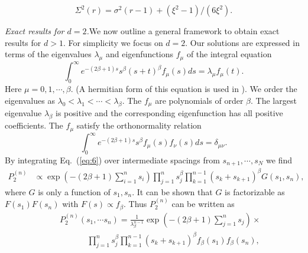 \documentclass[reprint,amsmath,amssymb,showpacs,aps,]{revtex4-1}
\begin{document}
{\begin{equation} \label{eq:19}
\Sigma^{2}(r)= \sigma^{2}(r-1) + (\xi^2 -1)/(6\xi^{2}).
\end{equation}\par
\textit{Exact results for $d=2$.}\textemdash  We now outline a general framework to obtain exact results for $d>1$. For simplicity we focus on $d=2$. Our solutions are expressed in terms of the eigenvalues $\lambda_{\mu}$ and eigenfunctions $f_{\mu}$ of the integral equation 
\begin{equation}\label{eq:20}
\int_{0}^{\infty}e^{-(2\beta+1)s} s^{\beta}(s+t)^{\beta}f_{\mu}(s)ds=\lambda_{\mu}f_{\mu}(t).
\end{equation}
Here $\mu= 0,1,\cdots, \beta$. (A hermitian form of this equation is used in \cite{BGS2}). We order the eigenvalues as $\lambda_{0}<\lambda_{1}< \cdots < \lambda_{\beta}$. The $f_{\mu}$ are polynomials of order $\beta$. The largest eigenvalue $\lambda_{\beta}$ is positive and the corresponding eigenfunction has all positive coefficients. The $f_{\mu}$ satisfy the orthonormality relation
\begin{equation}\label{eq:21}
\int_{0}^{\infty}e^{-(2\beta+1)s} s^{\beta}f_{\mu}(s)f_{\nu}(s)ds= \delta_{\mu\nu}.
\end{equation}
By integrating Eq.~(\ref{eq:6}) over intermediate spacings from $s_{n+1},\cdots,s_{N}$ we find
\begin{align}\label{eq:22}
P_{2}^{(n)}&\propto \exp\left(-(2\beta+1)\sum_{i=1}^{n}s_{i}\right)\prod_{j=1}^{n}s_{j}^{\beta}\prod_{k=1}^{n-1}(s_{k}+s_{k+1})^{\beta}G(s_{1},s_{n}),
\end{align}
where $G$ is only a function of $s_{1},s_{n}$. It can be shown that $G$ is factorizable as $F(s_{1})F(s_{n})$ with $F(s) \propto f_{\beta}$. Thus $P_{2}^{(n)}$ can be written as
\begin{eqnarray}
\label{eq:23}
&& P_{2}^{(n)}(s_{1},\cdots s_{n})= \frac{1}{\lambda_{\beta}^{n-1}}\exp\left(-(2\beta+1)\sum_{j=1}^{n}s_{j}\right) \times 
\nonumber \\
&& ~~~~~~~~~~~~~~~ \prod_{j=1}^{n}s_{j}^{\beta}\prod_{k=1}^{n-1}(s_{k}+s_{k+1})^{\beta}f_{\beta}(s_{1})f_{\beta}(s_{n}),
\end{eqnarray}
}
\end{document}
